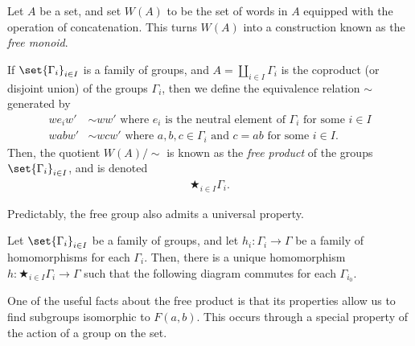 \documentclass[10pt]{mypackage2}
\begin{document}
\begin{definition}\label{def:free_product}
  Let $A$ be a set, and set $W(A)$ to be the set of words in $A$ equipped with the operation of concatenation. This turns $W(A)$ into a construction known as the \textit{free monoid}.\newline

  If $\set{\Gamma_i}_{i\in I}$ is a family of groups, and $A = \coprod_{i\in I}\Gamma_i$ is the coproduct (or disjoint union) of the groups $\Gamma_i$, then we define the equivalence relation $\sim$ generated by
  \begin{align*}
    we_iw' &\sim ww'\text{ where $e_i$ is the neutral element of $\Gamma_i$ for some $i\in I$}\\
    wabw' &\sim wcw'\text{ where $a,b,c\in \Gamma_i$ and $c=ab$ for some $i\in I$}.
  \end{align*}
  Then, the quotient $W(A)/\sim$ is known as the \textit{free product} of the groups $\set{\Gamma_i}_{i\in I}$, and is denoted
  \begin{align*}
    \bigstar_{i\in I}\Gamma_i.
  \end{align*}
\end{definition}
Predictably, the free group also admits a universal property.
\begin{theorem}\label{thm:universal_property}
  Let $\set{\Gamma_i}_{i\in I}$ be a family of groups, and let $h_i\colon \Gamma_i\rightarrow \Gamma$ be a family of homomorphisms for each $\Gamma_i$. Then, there is a unique homomorphism $h\colon \bigstar_{i\in I}\Gamma_i\rightarrow \Gamma$ such that the following diagram commutes for each $\Gamma_{i_0}$.
  \begin{center}
  \end{center}
\end{theorem}
One of the useful facts about the free product is that its properties allow us to find subgroups isomorphic to $F(a,b)$. This occurs through a special property of the action of a group on the set.
\end{document}
